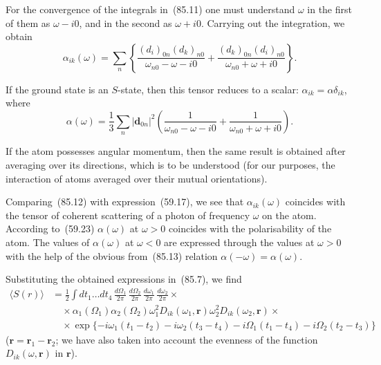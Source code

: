 For the convergence of the integrals in~(85.11) one must understand $\omega$ in the first of them as $\omega - i0$, and in the second as $\omega + i0$. Carrying out the integration, we obtain
\begin{equation}
\alpha_{ik}(\omega) = \sum_n\left\{\frac{(d_i)_{0n}(d_k)_{n0}}{\omega_{n0}-\omega-i0}+\frac{(d_k)_{0n}(d_i)_{n0}}{\omega_{n0}+\omega+i0}\right\}.
\tag{85.12}
\end{equation}

If the ground state is an $S$-state, then this tensor reduces to a scalar: $\alpha_{ik} = \alpha\delta_{ik}$, where
\begin{equation}
\alpha(\omega) = \frac{1}{3}\sum_n|\mathbf{d}_{0n}|^2\left(\frac{1}{\omega_{n0}-\omega-i0}+\frac{1}{\omega_{n0}+\omega+i0}\right).
\tag{85.13}
\end{equation}

If the atom possesses angular momentum, then the same result is obtained after averaging over its directions, which is to be understood (for our purposes, the interaction of atoms averaged over their mutual orientations).

Comparing~(85.12) with expression~(59.17), we see that $\alpha_{ik}(\omega)$ coincides with the tensor of coherent scattering of a photon of frequency $\omega$ on the atom. According to~(59.23) $\alpha(\omega)$ at $\omega > 0$ coincides with the polarisability of the atom. The values of $\alpha(\omega)$ at $\omega < 0$ are expressed through the values at $\omega > 0$ with the help of the obvious from~(85.13) relation $\alpha(-\omega) = \alpha(\omega)$.

Substituting the obtained expressions in~(85.7), we find
\begin{equation}
\begin{split}
\langle S(r)\rangle &= \frac{1}{2}\int dt_1\ldots dt_4\,\frac{d\Omega_1}{2\pi}\,\frac{d\Omega_2}{2\pi}\,\frac{d\omega_1}{2\pi}\,\frac{d\omega_2}{2\pi}\times\\
&\quad\times\alpha_1(\Omega_1)\alpha_2(\Omega_2)\omega_1^2 D_{ik}(\omega_1,\mathbf{r})\omega_2^2 D_{ik}(\omega_2,\mathbf{r})\times\\
&\quad\times\exp\{-i\omega_1(t_1-t_2)-i\omega_2(t_3-t_4)-i\Omega_1(t_1-t_4)-i\Omega_2(t_2-t_3)\}
\end{split}
\end{equation}
($\mathbf{r} = \mathbf{r}_1 - \mathbf{r}_2$; we have also taken into account the evenness of the function $D_{ik}(\omega, \mathbf{r})$ in $\mathbf{r}$).


